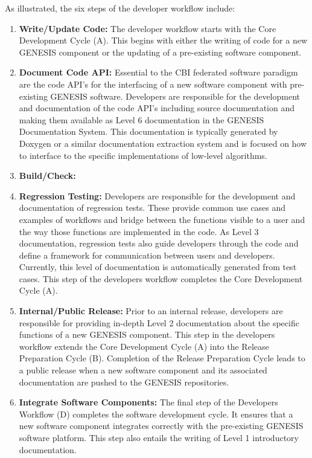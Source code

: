 \documentclass[12pt]{article}
\begin{document}
As illustrated, the six steps of the developer workflow include:
\begin{enumerate}
\item{\bf Write/Update Code:} The developer workflow starts with the Core Development Cycle (A). This begins with either the writing of code for a new GENESIS component or the updating of a pre-existing software component.
\item{\bf Document Code API:} Essential to the CBI federated software paradigm are the code API's for the interfacing of a new software component with pre-existing GENESIS software. Developers are responsible for the development and documentation of the code API's including source documentation and making them available as Level 6 documentation in the GENESIS Documentation System. This documentation is typically generated by Doxygen or a similar documentation extraction system and is focused on how to interface to the specific implementations of low-level algorithms. 
\item{\bf Build/Check:}
\item{\bf Regression Testing:} Developers are responsible for the development and documentation of regression tests. These provide common use cases and examples of workflows and bridge between the functions visible to a user and the way those functions are implemented in the code. As Level 3 documentation, regression tests also guide developers through the code and define a framework for communication between users and developers. Currently, this level of documentation is automatically generated from test cases. This step of the developers workflow completes the Core Development Cycle (A).
\item{\bf Internal/Public Release:} Prior to an internal release, developers are responsible for providing in-depth Level 2 documentation about the specific functions of a new GENESIS component. This step in the developers workflow extends the Core Development Cycle (A) into the Release Preparation Cycle (B). Completion of the Release Preparation Cycle leads to a public release when a new software component and its associated documentation are pushed to the GENESIS repositories.
\item{\bf Integrate Software Components:} The final step of the Developers Workflow (D) completes the software development cycle. It ensures that a new software component integrates correctly with the pre-existing GENESIS software platform. This step also entails the writing of Level 1 introductory documentation.
\end{enumerate}
\end{document}
